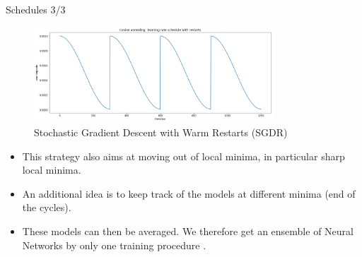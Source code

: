 \documentclass[handout,xcolor=pdftex,dvipsnames,table,mathserif]{beamer}
\begin{document}
\begin{frame}{Schedules 3/3}
\begin{figure}[htb]
  \centering
  \includegraphics[width=0.8\textwidth]{../graphics/cosine_annealing.png}
  \caption{Stochastic Gradient Descent with Warm Restarts (SGDR) \cite{loshchilov2016sgdr}}
\end{figure}
\begin{itemize}
	\item This strategy also aims at moving out of local minima, in particular sharp local minima. 
	\item An additional idea is to keep track of the models at different minima (end of the cycles).
	\item These models can then be averaged. We therefore get an ensemble of Neural Networks by only one training procedure \cite{huang2017snapshot}. 
\end{itemize}
\end{frame}

\end{document}
